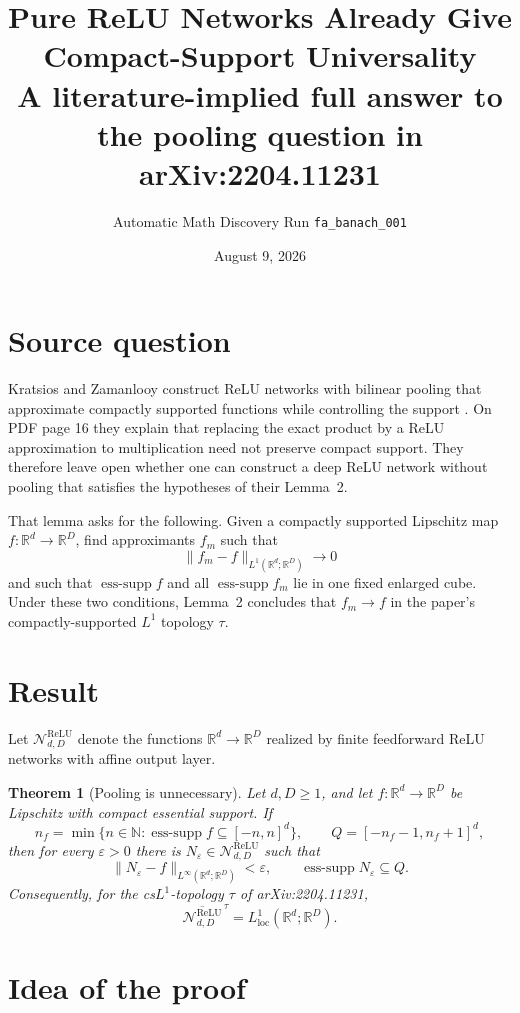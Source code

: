 \documentclass[11pt]{article}
\title{Pure ReLU Networks Already Give Compact-Support Universality\\
\large A literature-implied full answer to the pooling question in arXiv:2204.11231}
\author{Automatic Math Discovery Run \texttt{fa\_banach\_001}}
\date{August 9, 2026}
\newtheorem{theorem}{Theorem}
\newcommand{\R}{\mathbb{R}}
\newcommand{\esssupp}{\operatorname{ess\mbox{-}supp}}
\begin{document}
\maketitle

\section*{Source question}

Kratsios and Zamanlooy construct ReLU networks with bilinear pooling that
approximate compactly supported functions while controlling the support
\cite{KZ2022}.  On PDF page 16 they explain that replacing the exact product
by a ReLU approximation to multiplication need not preserve compact support.
They therefore leave open whether one can construct a deep ReLU network
without pooling that satisfies the hypotheses of their Lemma~2.

That lemma asks for the following.  Given a compactly supported Lipschitz map
\(f:\R^d\to\R^D\), find approximants \(f_m\) such that
\[
  \lVert f_m-f\rVert_{L^1(\R^d;\R^D)}\longrightarrow 0
\]
and such that \(\esssupp f\) and all \(\esssupp f_m\) lie in one fixed
enlarged cube.  Under these two conditions, Lemma~2 concludes that
\(f_m\to f\) in the paper's compactly-supported \(L^1\) topology \(\tau\).

\section*{Result}

Let \(\mathcal N^{\mathrm{ReLU}}_{d,D}\) denote the functions
\(\R^d\to\R^D\) realized by finite feedforward ReLU networks with affine
output layer.

\begin{theorem}[Pooling is unnecessary]
Let \(d,D\geq 1\), and let \(f:\R^d\to\R^D\) be Lipschitz with compact
essential support.  If
\[
 n_f=\min\{n\in\mathbb N:\esssupp f\subseteq[-n,n]^d\},
 \qquad Q=[-n_f-1,n_f+1]^d,
\]
then for every \(\varepsilon>0\) there is
\(N_\varepsilon\in\mathcal N^{\mathrm{ReLU}}_{d,D}\) such that
\[
 \lVert N_\varepsilon-f\rVert_{L^\infty(\R^d;\R^D)}<\varepsilon,
 \qquad \esssupp N_\varepsilon\subseteq Q.
\]
Consequently, for the cs\(L^1\)-topology \(\tau\) of arXiv:2204.11231,
\[
 \overline{\mathcal N^{\mathrm{ReLU}}_{d,D}}^{\,\tau}
 =L^1_{\mathrm{loc}}(\R^d;\R^D).
\]
\end{theorem}

\section*{Idea of the proof}
\end{document}

